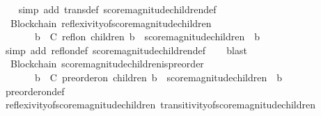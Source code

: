 \begin{isabellebody}
%
\isadelimproof
\ \ %
\endisadelimproof
%
\isatagproof
{}\isamarkupfalse%
\ {\isacharparenleft}simp\ add{\isacharcolon}\ trans{\isacharunderscore}def\ score{\isacharunderscore}magnitude{\isacharunderscore}children{\isacharunderscore}def{\isacharparenright}%
\endisatagproof
{\isafoldproof}%
%
\isadelimproof
\isanewline
%
\endisadelimproof
\ \ \isanewline
{}\isamarkupfalse%
\ {\isacharparenleft}\ Blockchain{\isacharparenright}\ reflexivity{\isacharunderscore}of{\isacharunderscore}score{\isacharunderscore}magnitude{\isacharunderscore}children\ {\isacharcolon}\isanewline
\ \ {\isachardoublequoteopen}{\isasymforall}\ {\isasymsigma}\ {\isasymin}\ {\isasymSigma}{\isachardot}\ {\isasymforall}\ b\ {\isasymin}\ C{\isachardot}\ refl{\isacharunderscore}on\ {\isacharparenleft}children\ {\isacharparenleft}b{\isacharcomma}\ {\isasymsigma}{\isacharparenright}{\isacharparenright}\ {\isacharparenleft}score{\isacharunderscore}magnitude{\isacharunderscore}children\ {\isasymsigma}\ b{\isacharparenright}{\isachardoublequoteclose}\isanewline
%
\isadelimproof
\ \ %
\endisadelimproof
%
\isatagproof
{}\isamarkupfalse%
\ {\isacharparenleft}simp\ add{\isacharcolon}\ refl{\isacharunderscore}on{\isacharunderscore}def\ score{\isacharunderscore}magnitude{\isacharunderscore}children{\isacharunderscore}def{\isacharparenright}\isanewline
\ \ \isamarkupfalse%
\ blast%
\endisatagproof
{\isafoldproof}%
%
\isadelimproof
\ \isanewline
%
\endisadelimproof
\isanewline
{}\isamarkupfalse%
\ {\isacharparenleft}\ Blockchain{\isacharparenright}\ score{\isacharunderscore}magnitude{\isacharunderscore}children{\isacharunderscore}is{\isacharunderscore}preorder\ {\isacharcolon}\isanewline
\ \ {\isachardoublequoteopen}{\isasymforall}\ {\isasymsigma}\ {\isasymin}\ {\isasymSigma}{\isachardot}\ {\isasymforall}\ b\ {\isasymin}\ C{\isachardot}\ preorder{\isacharunderscore}on\ {\isacharparenleft}children\ {\isacharparenleft}b{\isacharcomma}\ {\isasymsigma}{\isacharparenright}{\isacharparenright}\ {\isacharparenleft}score{\isacharunderscore}magnitude{\isacharunderscore}children\ {\isasymsigma}\ b{\isacharparenright}{\isachardoublequoteclose}\isanewline
%
\isadelimproof
\ \ %
\endisadelimproof
%
\isatagproof
{}\isamarkupfalse%
\ preorder{\isacharunderscore}on{\isacharunderscore}def\ \isanewline
\ \ \isamarkupfalse%
\ reflexivity{\isacharunderscore}of{\isacharunderscore}score{\isacharunderscore}magnitude{\isacharunderscore}children\ transitivity{\isacharunderscore}of{\isacharunderscore}score{\isacharunderscore}magnitude{\isacharunderscore}children\ \isamarkupfalse%

\end{isabellebody}
